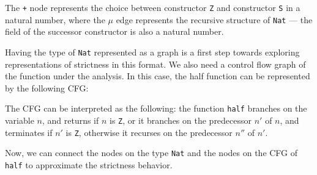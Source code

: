 \documentclass{article}
\begin{document}
The \verb|+| node represents the choice between constructor \verb|Z|
and constructor \verb|S| in a natural number, where the $\mu$ edge
represents the recursive structure of \verb|Nat| --- the field of the
successor constructor is also a natural number.

Having the type of \verb|Nat| represented as a graph is a first step
towards exploring representations of strictness in this format. We
also need a control flow graph of the function under the analysis. In
this case, the half function can be represented by the following CFG:

\begin{figure}[H]
  \centering
{}
\end{figure}

The CFG can be interpreted as the following: the function \verb|half|
branches on the variable $n$, and returns if $n$ is \verb|Z|, or it
branches on the predecessor $n'$ of $n$, and terminates if $n'$ is
\verb|Z|, otherwise it recurses on the predecessor $n''$ of $n'$.

Now, we can connect the nodes on the type \verb|Nat| and the nodes on
the CFG of \verb|half| to approximate the strictness behavior.
\end{document}
